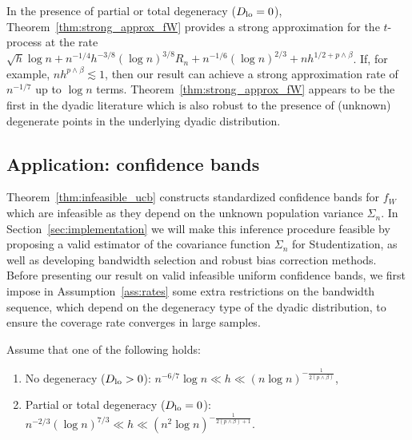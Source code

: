 In the presence of partial or total degeneracy ($D_{\textup{lo}} =0$),
Theorem~\ref{thm:strong_approx_fW} provides a strong approximation for the
$t$-process at the rate
$\sqrt{h}\log n + n^{-1/4}h^{-3/8}(\log n)^{3/8} R_n +
n^{-1/6}(\log n)^{2/3} + n h^{1/2+p\wedge\beta}$.
If, for example, $n h^{p\wedge\beta}\lesssim 1$,
then our result can achieve a strong
approximation rate of $n^{-1/7}$
up to $\log n $ terms.
Theorem~\ref{thm:strong_approx_fW}
appears to be the first in the dyadic literature
which is also robust to the presence of (unknown)
degenerate points in the underlying dyadic distribution.

\subsection{Application: confidence bands}

Theorem~\ref{thm:infeasible_ucb} constructs standardized confidence
bands for $f_W$ which are infeasible as they depend on the unknown population
variance $\Sigma_n$.
In Section~\ref{sec:implementation}
we will make this inference procedure
feasible by proposing a valid estimator of the covariance function $\Sigma_n$
for Studentization, as well as developing
bandwidth selection and robust bias correction methods.
Before presenting our result on valid infeasible uniform confidence bands,
we first impose in Assumption~\ref{ass:rates}
some extra restrictions on the bandwidth sequence,
which depend on the degeneracy type of the dyadic distribution,
to ensure the coverage rate converges in large samples.

\begin{assumption}
  \label{ass:rates}\onehalfspacing

  Assume that one of the following holds:

  \begin{enumerate}[label=(\roman*)]

    \item
      No degeneracy
      ($D_{\textup{lo}} > 0$):
      $n^{-6/7} \log n \ll h
      \ll (n \log n)^{-\frac{1}{2(p \wedge \beta)}}$,

    \item
      Partial or total degeneracy
      ($D_{\textup{lo}} = 0$):
      $n^{-2/3} (\log n)^{7/3} \ll h
      \ll (n^2 \log n)^{-\frac{1}{2(p \wedge \beta) + 1}}$.
  \end{enumerate}
\end{assumption}

